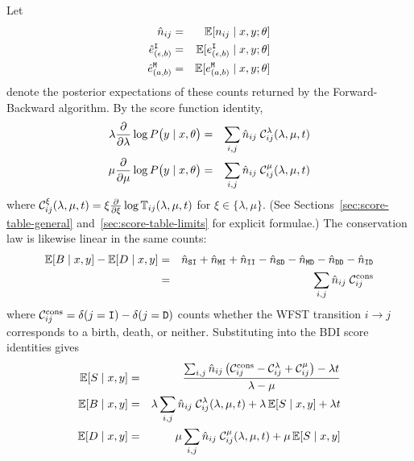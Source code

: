 Let
\begin{eqnarray*}
\hat n_{ij} & = & \mathbb{E}[n_{ij}\mid x,y;\theta] \\
\hat e^{\tt I}_{(\epsilon,b)} & = & \mathbb{E}[e^{\tt I}_{(\epsilon,b)}\mid x,y;\theta] \\
\hat e^{\tt M}_{(a,b)} & = & \mathbb{E}[e^{\tt M}_{(a,b)}\mid x,y;\theta] \\
\end{eqnarray*}
denote the posterior expectations of these counts returned by the Forward-Backward algorithm.
By the score function identity,
\begin{eqnarray*}
\lambda \frac{\partial}{\partial \lambda}
\log P\bigl(y\mid x, \theta\bigr)
& = &
\sum_{i,j} \hat n_{ij}\; \mathcal{C}^\lambda_{ij}(\lambda,\mu,t)
\\
\mu \frac{\partial}{\partial \mu}
\log P\bigl(y\mid x,\theta\bigr)
& = &
\sum_{i,j} \hat n_{ij}\; \mathcal{C}^\mu_{ij}(\lambda,\mu,t)
\end{eqnarray*}
where $\mathcal{C}^\xi_{ij}(\lambda,\mu,t) = \xi \frac{\partial}{\partial \xi}\log \mathbb{T}_{ij}(\lambda,\mu,t)$ for $\xi \in \{\lambda,\mu\}$.
(See Sections~\ref{sec:score-table-general} and~\ref{sec:score-table-limits} for explicit formulae.)
The conservation law is likewise linear in the same counts:
\begin{eqnarray}\label{eq:conservation-tkf}
\mathbb{E}[B \mid x,y] - \mathbb{E}[D \mid x,y]
& = &
\hat n_{{\tt S} {\tt I}}+\hat n_{{\tt M} {\tt I}}+\hat n_{{\tt I} {\tt I}}
-
\hat n_{{\tt S} {\tt D}}-\hat n_{{\tt M} {\tt D}}-\hat n_{{\tt D} {\tt D}}-\hat n_{{\tt I} {\tt D}} \\
& = & \sum_{i,j} \hat n_{ij}\; \mathcal{C}^{\mathrm{cons}}_{ij}
\end{eqnarray}
where $\mathcal{C}^{\mathrm{cons}}_{ij} = \delta(j={\tt I}) - \delta(j={\tt D})$ counts whether the WFST transition $i \to j$ corresponds to a birth, death, or neither.
Substituting into the BDI score identities gives
\begin{eqnarray}
\mathbb{E}[S \mid x,y]
& = &
\frac{
\sum_{i,j} \hat n_{ij} \left( \mathcal{C}^{\mathrm{cons}}_{ij} - \mathcal{C}^\lambda_{ij} + \mathcal{C}^\mu_{ij} \right)
-
\lambda t
}{\lambda-\mu}
\label{eq:exposure-tkf}
\\
\mathbb{E}[B \mid x,y]
& = &
\lambda \sum_{i,j} \hat n_{ij}\; \mathcal{C}^\lambda_{ij}(\lambda,\mu,t)
+
\lambda\,\mathbb{E}[S \mid x,y]
+
\lambda t
\label{eq:births-tkf}
\\
\mathbb{E}[D \mid x,y]
& = &
\mu \sum_{i,j} \hat n_{ij}\; \mathcal{C}^\mu_{ij}(\lambda,\mu,t)
+
\mu\,\mathbb{E}[S \mid x,y]
\label{eq:deaths-tkf}
\end{eqnarray}

